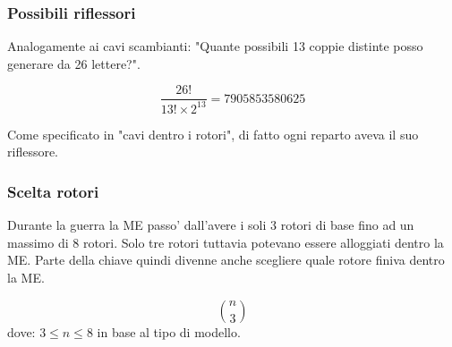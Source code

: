 \subsubsection{Possibili riflessori}
Analogamente ai cavi scambianti:
"Quante possibili 13 coppie distinte posso generare da 26 lettere?".

$$ \frac{26!}{13!\times2^13}= 7905853580625$$

Come specificato in "cavi dentro i rotori", di fatto ogni reparto aveva il suo riflessore.

\subsubsection{Scelta rotori}
Durante la guerra la ME passo' dall'avere i soli 3 rotori di base fino ad un
massimo di 8 rotori.
Solo tre rotori tuttavia potevano essere alloggiati dentro la ME.
Parte della chiave quindi divenne anche scegliere quale rotore finiva dentro la ME.

$$ \binom{n}{3}$$
dove: $ 3 \le n \le 8$ in base al tipo di modello.
